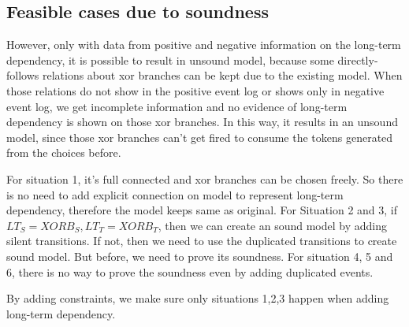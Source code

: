 \subsection{Feasible cases due to soundness}
However, only with data from positive and negative information on the long-term dependency, it is possible to result in unsound model, because  some directly-follows relations about xor branches can be kept due to the existing model. When those relations do not show in the positive event log or shows only in negative event log, we get incomplete information and no evidence of long-term dependency is shown on those xor branches. In this way, it results in an unsound model, since those xor branches can't get fired to consume the tokens generated from the choices before.

For situation 1, it's full connected and xor branches can be chosen freely. So there is no need to add explicit connection on model to represent long-term dependency, therefore the model keeps same as original. 
For Situation 2 and 3, if $LT_S = XORB_S, LT_T= XORB_T$, then we can create an sound model by adding silent transitions. If not, then we need to use the duplicated transitions to create sound model. But before, we need to prove its soundness. 
For situation 4, 5 and 6, there is no way to prove the soundness even by adding duplicated events.

By adding constraints, we make sure only situations 1,2,3 happen when adding long-term dependency. 
